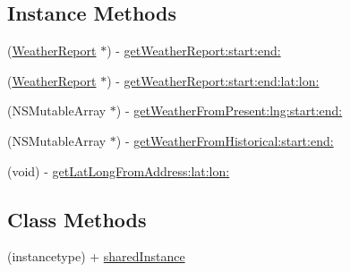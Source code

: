 \subsection*{Instance Methods}
\begin{DoxyCompactItemize}
\item 
(\hyperlink{interface_weather_report}{Weather\-Report} $\ast$) -\/ \hyperlink{interface_weather_a_p_i_aec65367ed89cc10d855a561a01819a61}{get\-Weather\-Report\-:start\-:end\-:}
\item 
(\hyperlink{interface_weather_report}{Weather\-Report} $\ast$) -\/ \hyperlink{interface_weather_a_p_i_a923043c755894633e58b7d8dbd164a30}{get\-Weather\-Report\-:start\-:end\-:lat\-:lon\-:}
\item 
(N\-S\-Mutable\-Array $\ast$) -\/ \hyperlink{interface_weather_a_p_i_aa3c918e845c1788e0802e67a1a7fd0d7}{get\-Weather\-From\-Present\-:lng\-:start\-:end\-:}
\item 
(N\-S\-Mutable\-Array $\ast$) -\/ \hyperlink{interface_weather_a_p_i_a41a7e428642bb5361e5e4f4ed472ccb5}{get\-Weather\-From\-Historical\-:start\-:end\-:}
\item 
(void) -\/ \hyperlink{interface_weather_a_p_i_a289d134b824df2c726779f5da8bd6032}{get\-Lat\-Long\-From\-Address\-:lat\-:lon\-:}
\end{DoxyCompactItemize}
\subsection*{Class Methods}
\begin{DoxyCompactItemize}
\item 
(instancetype) + \hyperlink{interface_weather_a_p_i_a140d5b84ad32b8b208e8750882602040}{shared\-Instance}
\end{DoxyCompactItemize}


